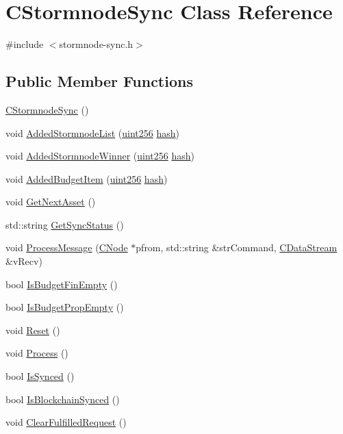 \hypertarget{class_c_stormnode_sync}{}\section{C\+Stormnode\+Sync Class Reference}
\label{class_c_stormnode_sync}


{\ttfamily \#include $<$stormnode-\/sync.\+h$>$}

\subsection*{Public Member Functions}
\begin{DoxyCompactItemize}
\item 
\hyperlink{class_c_stormnode_sync_ab51f592abb72b888aa291dc4e5f5ca01}{C\+Stormnode\+Sync} ()
\item 
void \hyperlink{class_c_stormnode_sync_ad9e9ad7392c3fa1ec0af4b178b3c62c0}{Added\+Stormnode\+List} (\hyperlink{classuint256}{uint256} \hyperlink{cache_8cc_a11ecb029164e055f28f4123ce3748862}{hash})
\item 
void \hyperlink{class_c_stormnode_sync_a686a36163137e9079365e7fd0ede826c}{Added\+Stormnode\+Winner} (\hyperlink{classuint256}{uint256} \hyperlink{cache_8cc_a11ecb029164e055f28f4123ce3748862}{hash})
\item 
void \hyperlink{class_c_stormnode_sync_af200f11664c64e5256ad77bd0465b634}{Added\+Budget\+Item} (\hyperlink{classuint256}{uint256} \hyperlink{cache_8cc_a11ecb029164e055f28f4123ce3748862}{hash})
\item 
void \hyperlink{class_c_stormnode_sync_a3c70130712267c3c100a69d35b97acf8}{Get\+Next\+Asset} ()
\item 
std\+::string \hyperlink{class_c_stormnode_sync_a11096b1811db2d0b8d495a82010969d9}{Get\+Sync\+Status} ()
\item 
void \hyperlink{class_c_stormnode_sync_aaca810ce9a48fed7e8608f73c0d5f29d}{Process\+Message} (\hyperlink{class_c_node}{C\+Node} $\ast$pfrom, std\+::string \&str\+Command, \hyperlink{class_c_data_stream}{C\+Data\+Stream} \&v\+Recv)
\item 
bool \hyperlink{class_c_stormnode_sync_a71a5cb2516527d38bca276b5bc90c3f1}{Is\+Budget\+Fin\+Empty} ()
\item 
bool \hyperlink{class_c_stormnode_sync_a85c30a78fdad0ac91f6fc1a4c17077e5}{Is\+Budget\+Prop\+Empty} ()
\item 
void \hyperlink{class_c_stormnode_sync_a14d6ee22d6cd11c4045b9fb8c7891551}{Reset} ()
\item 
void \hyperlink{class_c_stormnode_sync_adaaeb592c3432c8a459560523c7be207}{Process} ()
\item 
bool \hyperlink{class_c_stormnode_sync_a0f196a2ca46b0cc4de3a488a4cbc2374}{Is\+Synced} ()
\item 
bool \hyperlink{class_c_stormnode_sync_adfb3343f29476ca833084be0320a7d50}{Is\+Blockchain\+Synced} ()
\item 
void \hyperlink{class_c_stormnode_sync_a4852378d102b54360f8656731d264c04}{Clear\+Fulfilled\+Request} ()
\end{DoxyCompactItemize}
